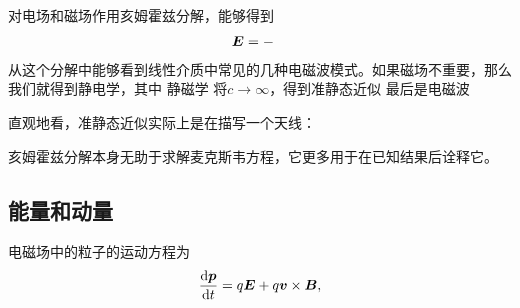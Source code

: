 对电场和磁场作用亥姆霍兹分解，能够得到
\begin{equation}
    \begin{aligned}
        \vb*{E} &= - 
    \end{aligned}
\end{equation}
从这个分解中能够看到线性介质中常见的几种电磁波模式。如果磁场不重要，那么我们就得到静电学，其中
静磁学
将$c \to \infty$，得到准静态近似
最后是电磁波

直观地看，准静态近似实际上是在描写一个天线：

亥姆霍兹分解本身无助于求解麦克斯韦方程，它更多用于在已知结果后诠释它。

\subsection{能量和动量}

电磁场中的粒子的运动方程为
\begin{equation}
    \dv{\vb*{p}}{t} = q \vb*{E} + q \vb*{v} \times \vb*{B},
\end{equation}

